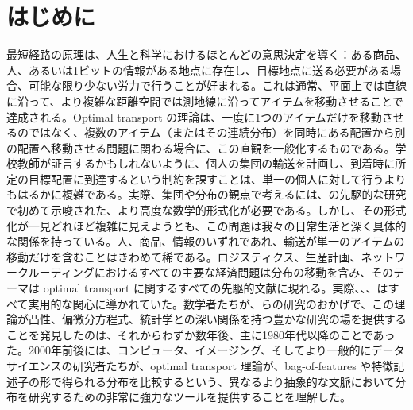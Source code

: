 \chapter{はじめに}
\label{c-intro}

最短経路の原理は、人生と科学におけるほとんどの意思決定を導く：ある商品、人、あるいは1ビットの情報がある地点に存在し、目標地点に送る必要がある場合、可能な限り少ない労力で行うことが好まれる。これは通常、平面上では直線に沿って、より複雑な距離空間では測地線に沿ってアイテムを移動させることで達成される。Optimal transport の理論は、一度に1つのアイテムだけを移動させるのではなく、複数のアイテム（またはその連続分布）を同時にある配置から別の配置へ移動させる問題に関わる場合に、この直観を一般化するものである。学校教師が証言するかもしれないように、個人の集団の輸送を計画し、到着時に所定の目標配置に到達するという制約を課すことは、単一の個人に対して行うよりもはるかに複雑である。実際、集団や分布の観点で考えるには、\citet{Monge1781}の先駆的な研究で初めて示唆された、より高度な数学的形式化が必要である。しかし、その形式化が一見どれほど複雑に見えようとも、この問題は我々の日常生活と深く具体的な関係を持っている。人、商品、情報のいずれであれ、輸送が単一のアイテムの移動だけを含むことはきわめて稀である。ロジスティクス、生産計画、ネットワークルーティングにおけるすべての主要な経済問題は分布の移動を含み、そのテーマは optimal transport に関するすべての先駆的文献に現れる。実際、\citet{tolstoi1930methods}、\citet{Hitchcock41}、\citet{Kantorovich42}はすべて実用的な関心に導かれていた。数学者たちが、\citet{Brenier91}らの研究のおかげで、この理論が凸性、偏微分方程式、統計学との深い関係を持つ豊かな研究の場を提供することを発見したのは、それからわずか数年後、主に1980年代以降のことであった。2000年前後には、コンピュータ、イメージング、そしてより一般的にデータサイエンスの研究者たちが、optimal transport 理論が、bag-of-features や特徴記述子の形で得られる分布を比較するという、異なるより抽象的な文脈において分布を研究するための非常に強力なツールを提供することを理解した。

